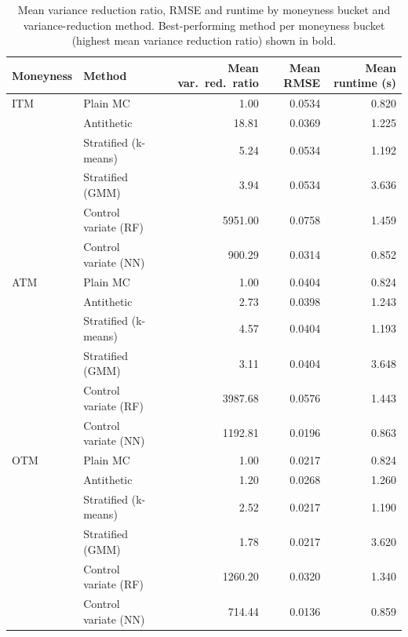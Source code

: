 \begin{table}[ht]
\centering
\caption{Mean variance reduction ratio, RMSE and runtime by moneyness bucket and variance-reduction method. Best-performing method per moneyness bucket (highest mean variance reduction ratio) shown in bold.}
\label{tab:by_moneyness}
\begin{tabular}{llrrr}
\toprule
Moneyness & Method & Mean var.\ red.\ ratio & Mean RMSE & Mean runtime (s) \\
\midrule
ITM & Plain MC & 1.00 & 0.0534 & 0.820 \\
 & Antithetic & 18.81 & 0.0369 & 1.225 \\
 & Stratified (k-means) & 5.24 & 0.0534 & 1.192 \\
 & Stratified (GMM) & 3.94 & 0.0534 & 3.636 \\
 & Control variate (RF) & 5951.00 & 0.0758 & 1.459 \\
 & Control variate (NN) & 900.29 & 0.0314 & 0.852 \\
\addlinespace
ATM & Plain MC & 1.00 & 0.0404 & 0.824 \\
 & Antithetic & 2.73 & 0.0398 & 1.243 \\
 & Stratified (k-means) & 4.57 & 0.0404 & 1.193 \\
 & Stratified (GMM) & 3.11 & 0.0404 & 3.648 \\
 & Control variate (RF) & 3987.68 & 0.0576 & 1.443 \\
 & Control variate (NN) & 1192.81 & 0.0196 & 0.863 \\
\addlinespace
OTM & Plain MC & 1.00 & 0.0217 & 0.824 \\
 & Antithetic & 1.20 & 0.0268 & 1.260 \\
 & Stratified (k-means) & 2.52 & 0.0217 & 1.190 \\
 & Stratified (GMM) & 1.78 & 0.0217 & 3.620 \\
 & Control variate (RF) & 1260.20 & 0.0320 & 1.340 \\
 & Control variate (NN) & 714.44 & 0.0136 & 0.859 \\
\bottomrule
\end{tabular}
\end{table}
